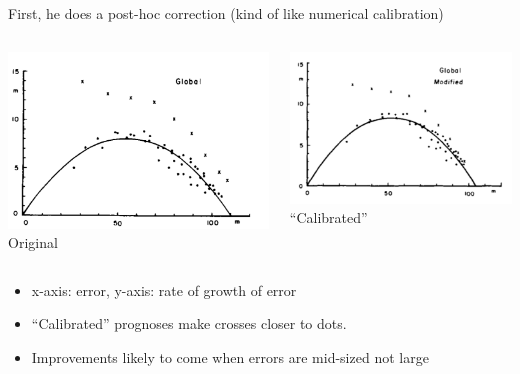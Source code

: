 \documentclass[aspectratio=169]{beamer}
\begin{document}
\begin{frame}

First, he does a post-hoc correction (kind of like numerical calibration) \pause
\begin{columns}[c]
\begin{center}
\includegraphics[height = 0.5\textheight]{figures/lorenz_atmospheric_1982_fig2}
Original
\end{center}
    \pause
    \begin{center}
\begin{center}
\includegraphics[height = 0.5\textheight]{figures/lorenz_atmospheric_1982_fig3}
``Calibrated''
\end{center}
    \end{center}
\end{columns}

\begin{itemize}
\item x-axis: error, y-axis: rate of growth of error
\pause
\item ``Calibrated'' prognoses make crosses closer to dots.
\pause
\item Improvements likely to come when errors are mid-sized not large
\end{itemize}

\end{frame}
\end{document}
